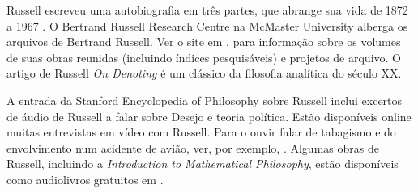 \documentclass[../../../include/open-logic-section]{subfiles}
\begin{document}
\begin{reading}
Russell escreveu uma autobiografia em três partes, que abrange sua
vida de 1872 a 1967 \citep{Russell1967,Russell1968,Russell1969}.  O
Bertrand Russell Research Centre na McMaster University alberga os
arquivos de Bertrand Russell. Ver o site em \citet{Duncan2015},
para informação sobre os volumes de suas obras reunidas (incluindo
índices pesquisáveis) e projetos de arquivo.  O artigo de Russell
\emph{On Denoting} \citep{Russell1905} é um clássico da filosofia
analítica do século XX.

A entrada da Stanford Encyclopedia of Philosophy sobre Russell
\citep{Irvine2015} inclui excertos de áudio de Russell a falar sobre
Desejo e teoria política. Estão disponíveis online muitas entrevistas
em vídeo com Russell. Para o ouvir falar de tabagismo e do envolvimento
num acidente de avião, ver, por exemplo, \citet{RussellND}. Algumas
obras de Russell, incluindo a \emph{Introduction to Mathematical
Philosophy}, estão disponíveis como audiolivros gratuitos em
\citet{LibriVoxND}.
\end{reading}
\end{document}
